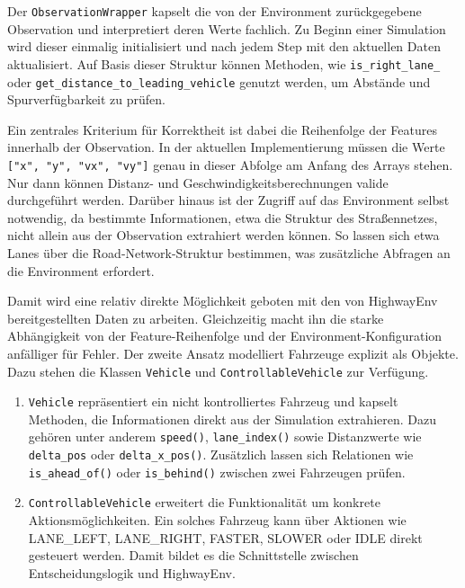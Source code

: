 Der \texttt{ObservationWrapper} kapselt die von der Environment zurückgegebene Observation und interpretiert deren Werte fachlich. Zu Beginn einer Simulation wird dieser einmalig initialisiert und nach jedem Step mit den aktuellen Daten aktualisiert. Auf Basis dieser Struktur können Methoden, wie \texttt{is\_right\_lane\_} oder \texttt{get\_distance\_to\_leading\_vehicle} genutzt werden, um Abstände und Spurverfügbarkeit zu prüfen.

Ein zentrales Kriterium für Korrektheit ist dabei die Reihenfolge der Features innerhalb der Observation. In der aktuellen Implementierung müssen die Werte \verb|["x", "y", "vx", "vy"]| genau in dieser Abfolge am Anfang des Arrays stehen. Nur dann können Distanz- und Geschwindigkeitsberechnungen valide durchgeführt werden. Darüber hinaus ist der Zugriff auf das Environment selbst notwendig, da bestimmte Informationen, etwa die Struktur des Straßennetzes, nicht allein aus der Observation extrahiert werden können. So lassen sich etwa Lanes über die Road-Network-Struktur bestimmen, was zusätzliche Abfragen an die Environment erfordert. 

Damit wird eine relativ direkte Möglichkeit geboten mit den von HighwayEnv bereitgestellten Daten zu arbeiten. Gleichzeitig macht ihn die starke Abhängigkeit von der Feature-Reihenfolge und der Environment-Konfiguration anfälliger für Fehler.
\newline
\newline
Der zweite Ansatz modelliert Fahrzeuge explizit als Objekte. Dazu stehen die Klassen \texttt{Vehicle} und \texttt{ControllableVehicle} zur Verfügung.
\begin{enumerate}
    \item \texttt{Vehicle} repräsentiert ein nicht kontrolliertes Fahrzeug und kapselt Methoden, die Informationen direkt aus der Simulation extrahieren. Dazu gehören unter anderem \texttt{speed()}, \texttt{lane\_index()} sowie Distanzwerte wie \texttt{delta\_pos} oder \texttt{delta\_x\_pos()}. Zusätzlich lassen sich Relationen wie \texttt{is\_ahead\_of()} oder \texttt{is\_behind()} zwischen zwei Fahrzeugen prüfen.
    \item \texttt{ControllableVehicle} erweitert die Funktionalität um konkrete Aktionsmöglichkeiten. Ein solches Fahrzeug kann über Aktionen wie LANE\_LEFT, LANE\_RIGHT, FASTER, SLOWER oder IDLE direkt gesteuert werden. Damit bildet es die Schnittstelle zwischen Entscheidungslogik und HighwayEnv.
\end{enumerate}

